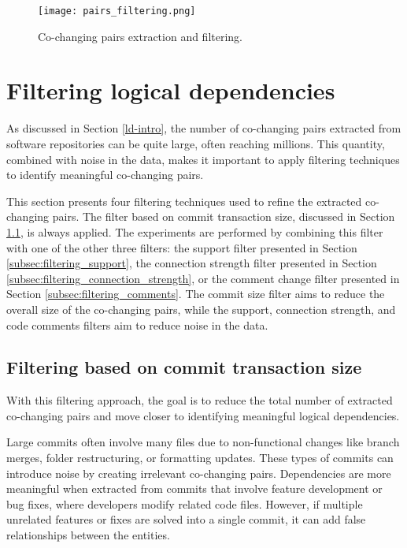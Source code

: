 \begin{figure}[H]
\centering
\texttt{[image: pairs\_filtering.png]}
\caption{Co-changing pairs extraction and filtering.}
\label{fig:figfiltering}
\end{figure}



\section{Filtering logical dependencies}
\label{sec:filtering_logical_dependencies}

\hspace{4em}As discussed in Section \ref{ld-intro}, the number of co-changing pairs extracted from software repositories can be quite large, often reaching millions. This quantity, combined with noise in the data, makes it important to apply filtering techniques to identify meaningful co-changing pairs.

This section presents four filtering techniques used to refine the extracted co-changing pairs. The filter based on commit transaction size, discussed in Section \ref{subsec:filtering_transaction_size}, is always applied. The experiments are performed by combining this filter with one of the other three filters: the support filter presented in Section \ref{subsec:filtering_support}, the connection strength filter presented in Section \ref{subsec:filtering_connection_strength}, or the comment change filter presented in Section \ref{subsec:filtering_comments}. The commit size filter aims to reduce the overall size of the co-changing pairs, while the support, connection strength, and code comments filters aim to reduce noise in the data.

\subsection{Filtering based on commit transaction size}
\label{subsec:filtering_transaction_size}

\hspace{4em}With this filtering approach, the goal is to reduce the total number of extracted co-changing pairs and move closer to identifying meaningful logical dependencies. 

Large commits often involve many files due to non-functional changes like branch merges, folder restructuring, or formatting updates. These types of commits can introduce noise by creating irrelevant co-changing pairs. Dependencies are more meaningful when extracted from commits that involve feature development or bug fixes, where developers modify related code files. However, if multiple unrelated features or fixes are solved into a single commit, it can add false relationships between the entities.

